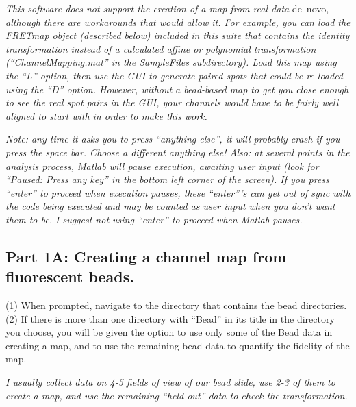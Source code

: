 \documentclass[11pt]{article}
\newcommand{\sj}[1]{\textcolor{red}{#1}}
\begin{document}
{\it This software does not support the creation of a map from real data} de~novo, {\it although there are workarounds that would allow it.  For example, you can load the FRETmap object (described below) included in this suite that contains the identity transformation instead of a calculated affine or polynomial transformation (``ChannelMapping.mat'' in the SampleFiles subdirectory). Load this map using the ``L'' option, then use the GUI to generate paired spots that could be re-loaded using the ``D'' option.  However, without a bead-based map to get you close enough to see the real spot pairs in the GUI, your channels would have to be fairly well aligned to start with in order to make this work.}

{\it Note: any time it asks you to press ``anything else'', it will probably crash if you press the space bar. Choose a different anything else!  Also: at several points in the analysis process, Matlab will pause execution, awaiting user input (look for ``Paused: Press any key'' in the bottom left corner of the screen). If you press ``enter'' to proceed when execution pauses, these ``enter'''s can get out of sync with the code being executed and may be counted as user input when you don't want them to be.  I suggest not using ``enter'' to proceed when Matlab pauses.}

\subsection{Part 1A: Creating a channel map from fluorescent beads.}

(1) When prompted, navigate to the directory that contains the bead directories. \\

\noindent (2) If there is more than one directory with ``Bead'' in its title in the directory you choose, you will be given the option to use only some of the Bead data in creating a map, and to use the remaining bead data to quantify the fidelity of the map. 

{\it I usually collect data on 4-5 fields of view of our bead slide, use 2-3 of them to create a map, and use the remaining ``held-out'' data to check the transformation. }%
\end{document}
